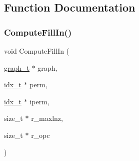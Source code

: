 \subsection{Function Documentation}
\mbox{\label{a00329_a929cf6af13d6bf71bc61657211472eed}} 
\subsubsection{\texorpdfstring{Compute\+Fill\+In()}{ComputeFillIn()}}
{\footnotesize\ttfamily void Compute\+Fill\+In (\begin{DoxyParamCaption}\item[{\hyperlink{a00734}{graph\+\_\+t} $\ast$}]{graph,  }\item[{\hyperlink{a00876_aaa5262be3e700770163401acb0150f52}{idx\+\_\+t} $\ast$}]{perm,  }\item[{\hyperlink{a00876_aaa5262be3e700770163401acb0150f52}{idx\+\_\+t} $\ast$}]{iperm,  }\item[{size\+\_\+t $\ast$}]{r\+\_\+maxlnz,  }\item[{size\+\_\+t $\ast$}]{r\+\_\+opc }\end{DoxyParamCaption})}

